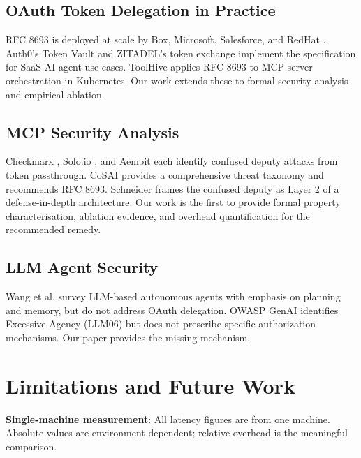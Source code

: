 \documentclass[journal]{IEEEtran}
\begin{document}
\subsection{OAuth Token Delegation in Practice}

RFC 8693 \cite{rfc8693} is deployed at scale by Box, Microsoft, Salesforce, and
RedHat \cite{rfc8693_deploy}. Auth0's Token Vault \cite{auth0_token_vault} and
ZITADEL's token exchange \cite{zitadel_te} implement the specification for SaaS
AI agent use cases. ToolHive \cite{toolhive} applies RFC 8693 to MCP server
orchestration in Kubernetes. Our work extends these to formal security analysis
and empirical ablation.

\subsection{MCP Security Analysis}

Checkmarx \cite{checkmarx_mcp}, Solo.io \cite{solo_mcp}, and Aembit
\cite{aembit_mcp} each identify confused deputy attacks from token passthrough.
CoSAI \cite{cosai_mcp} provides a comprehensive threat taxonomy and recommends
RFC 8693. Schneider \cite{schneider_mcp} frames the confused deputy as Layer 2
of a defense-in-depth architecture. Our work is the first to provide formal
property characterisation, ablation evidence, and overhead quantification for the
recommended remedy.

\subsection{LLM Agent Security}

Wang et al. \cite{wang2024survey} survey LLM-based autonomous agents with
emphasis on planning and memory, but do not address OAuth delegation. OWASP GenAI
\cite{owasp_genai} identifies Excessive Agency (LLM06) but does not prescribe
specific authorization mechanisms. Our paper provides the missing mechanism.


\section{Limitations and Future Work}
\label{sec:limitations}

\textbf{Single-machine measurement}: All latency figures are from one machine.
Absolute values are environment-dependent; relative overhead is the meaningful
comparison.
\end{document}

